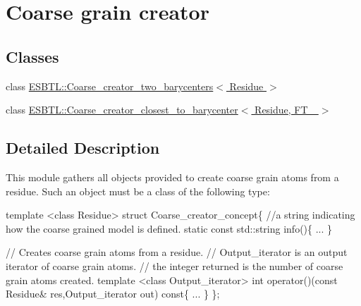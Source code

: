 \hypertarget{group__coarse__creator}{}\section{Coarse grain creator}
\label{group__coarse__creator}
\subsection*{Classes}
\begin{DoxyCompactItemize}
\item 
class \hyperlink{classESBTL_1_1Coarse__creator__two__barycenters}{E\+S\+B\+T\+L\+::\+Coarse\+\_\+creator\+\_\+two\+\_\+barycenters$<$ Residue $>$}
\item 
class \hyperlink{classESBTL_1_1Coarse__creator__closest__to__barycenter}{E\+S\+B\+T\+L\+::\+Coarse\+\_\+creator\+\_\+closest\+\_\+to\+\_\+barycenter$<$ Residue, F\+T\+\_\+ $>$}
\end{DoxyCompactItemize}


\subsection{Detailed Description}
This module gathers all objects provided to create coarse grain atoms from a residue. Such an object must be a class of the following type\+: 
\begin{DoxyCode}
\textcolor{keyword}{template} <\textcolor{keyword}{class} Res\textcolor{keywordtype}{id}ue>
\textcolor{keyword}{struct }Coarse\_creator\_concept\{
  \textcolor{comment}{//a string indicating how the coarse grained model is defined.}
  \textcolor{keyword}{static} \textcolor{keyword}{const} std::string info()\{ ... \}

  \textcolor{comment}{// Creates coarse grain atoms from a residue.}
  \textcolor{comment}{// Output\_iterator is an output iterator of coarse grain atoms.}
  \textcolor{comment}{// the integer returned is the number of coarse grain atoms created.}
  \textcolor{keyword}{template} <\textcolor{keyword}{class} Output\_iterator>
  \textcolor{keywordtype}{int} operator()(\textcolor{keyword}{const} Residue& res,Output\_iterator out)\textcolor{keyword}{ const}\{ ... \}
\};
\end{DoxyCode}
 